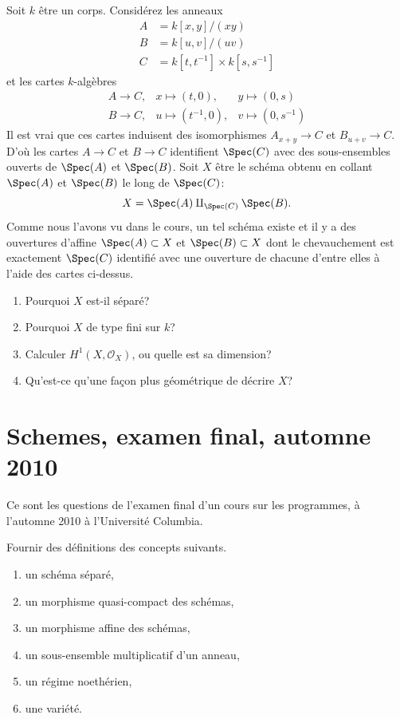 \begin{exercise}
\label{exercise-glueing}
Soit $k$ être un
corps. Considérez les anneaux
\begin{align*}
A & = k[x, y]/(xy) \\
B & = k[u, v]/(uv) \\
C & = k[t, t^{-1}] \times k[s, s^{-1}]
\end{align*}
et les cartes $k$-algèbres
$$
\begin{matrix}
A \longrightarrow C, &
x \mapsto (t, 0), &
y \mapsto (0, s) \\
B \longrightarrow C, &
u \mapsto (t^{-1}, 0), &
v \mapsto (0, s^{-1})
\end{matrix}
$$
Il est vrai que ces cartes induisent des isomorphismes $A_{x
+ y} \to C$ et $B_{u + v} \to C$. D'où les cartes
$A \to C$ et $B \to C$ identifient $\Spec(C)$ avec
des sous-ensembles ouverts de $\Spec(A)$ et $\Spec(B)$. Soit $X$ être le schéma
obtenu en collant $\Spec(A)$ et $\Spec(B)$ le long de $\Spec(C)$:
$$
X = \Spec(A) \amalg_{\Spec(C)} \Spec(B).
$$
Comme nous l'avons vu dans le cours, un tel schéma existe et il
y a des ouvertures d'affine $\Spec(A) \subset X$ et $\Spec(B) \subset
X$ dont le chevauchement est exactement $\Spec(C)$ identifié avec une ouverture de chacune
d'entre elles à l'aide des cartes ci-dessus.
\begin{enumerate}
\item Pourquoi $X$ est-il séparé?
\item Pourquoi $X$ de type fini sur $k$?
\item Calculer $H^1(X, \mathcal{O}_X)$, ou quelle est sa dimension?
\item Qu'est-ce qu'une façon plus géométrique de décrire $X$?
\end{enumerate}
\end{exercise}





\section{Schemes, examen final, automne 2010}
\label{section-final-exam-fall-2010}

\noindent
Ce sont les questions de l'examen final d'un cours sur les
programmes, à l'automne 2010 à l'Université Columbia.

\begin{exercise}[Definitions]
\label{exercise-definitions-fall-2010}
Fournir des définitions des concepts suivants.
\begin{enumerate}
\item un schéma séparé,
\item un morphisme quasi-compact des schémas,
\item un morphisme affine des schémas,
\item un sous-ensemble multiplicatif d'un anneau,
\item un régime noethérien,
\item une variété.
\end{enumerate}
\end{exercise}

